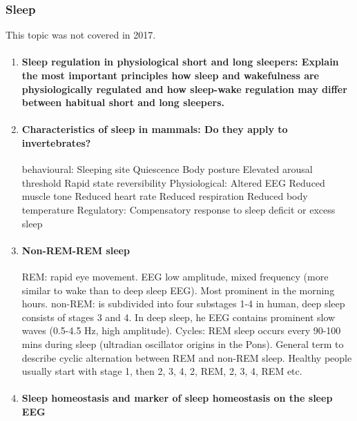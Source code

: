 \documentclass[12pt,article,oneside,a4paper]{memoir}
\begin{document}
\subsubsection{Sleep}
This topic was not covered in 2017.
\begin{enumerate}
\item \paragraph{Sleep regulation in physiological short and long sleepers:
Explain the most important principles how sleep and wakefulness are
physiologically regulated and how sleep-wake regulation may differ between
habitual short and long sleepers.}\label{question:sleep-physiological}

\item \paragraph{Characteristics of sleep in mammals: Do they apply to
invertebrates?}
behavioural:
Sleeping site 
Quiescence
Body posture
Elevated arousal threshold
Rapid state reversibility
Physiological:
Altered EEG
Reduced muscle tone
Reduced heart rate
Reduced respiration
Reduced body temperature
Regulatory:
Compensatory response to sleep deficit or excess sleep

\item \paragraph{Non-REM-REM sleep}

REM: rapid eye movement. EEG low amplitude, mixed frequency (more similar to
wake than to deep sleep EEG). Most prominent in the morning hours.
non-REM: is subdivided into four substages 1-4 in human, deep sleep consists
of stages 3 and 4. In deep sleep, he EEG contains prominent slow waves (0.5-4.5
Hz, high amplitude).
Cycles: REM sleep occurs every 90-100 mins during sleep (ultradian oscillator
origins in the Pons). General term to describe cyclic alternation between REM
and non-REM sleep. Healthy people usually start with stage 1, then 2, 3, 4, 2,
REM, 2, 3, 4, REM etc.

\item \paragraph{Sleep homeostasis and marker of sleep homeostasis on the sleep
EEG}


\end{enumerate}
\end{document}
